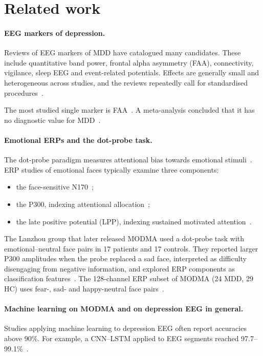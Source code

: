 \section{Related work}

\paragraph{EEG markers of depression.}
Reviews of EEG markers of MDD have catalogued many candidates. These include quantitative band power, frontal alpha
asymmetry (FAA), connectivity, vigilance, sleep EEG and event-related potentials. Effects are generally small and
heterogeneous across studies, and the reviews repeatedly call for standardised
procedures~\cite{olbrich2013eeg,deaguiar2019review,simmatis2023technical}.

The most studied single marker is FAA~\cite{allen2015faa}. A meta-analysis concluded that it has no diagnostic value
for MDD~\cite{vandervinne2017faa}.

\paragraph{Emotional ERPs and the dot-probe task.}
The dot-probe paradigm measures attentional bias towards emotional stimuli~\cite{macleod1986attentional}. ERP studies of
emotional faces typically examine three components:
\begin{itemize}
  \item the face-sensitive N170~\cite{bentin1996n170};
  \item the P300, indexing attentional allocation~\cite{polich2007p300};
  \item the late positive potential (LPP), indexing sustained motivated attention~\cite{hajcak2010erp}.
\end{itemize}
The Lanzhou group that later released MODMA used a dot-probe task with emotional--neutral face pairs in 17 patients and
17 controls. They reported larger P300 amplitudes when the probe replaced a sad face, interpreted as difficulty
disengaging from negative information, and explored ERP components as classification
features~\cite{li2018attentional}. The 128-channel ERP subset of MODMA (24 MDD, 29 HC) uses fear-, sad- and
happy-neutral face pairs~\cite{cai2022modma}.

\paragraph{Machine learning on MODMA and on depression EEG in general.}
Studies applying machine learning to depression EEG often report accuracies above 90\%. For example, a CNN--LSTM
applied to EEG segments reached 97.7--99.1\%~\cite{ay2019automated}.

